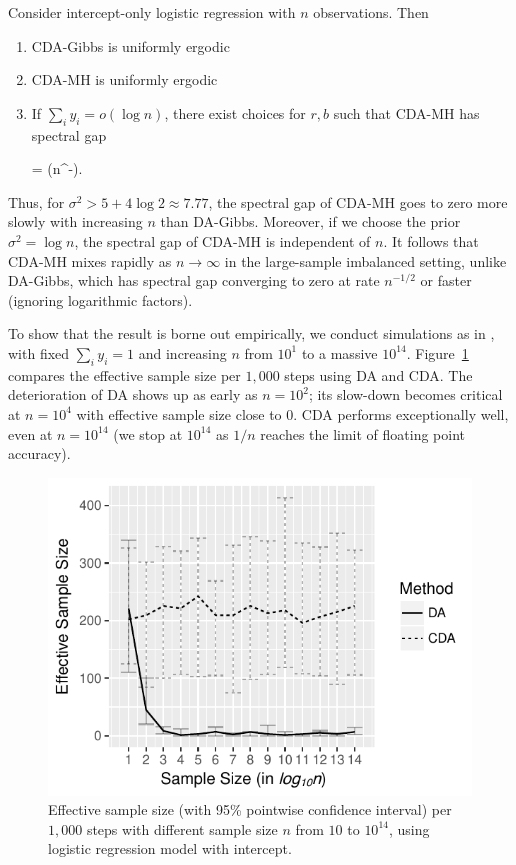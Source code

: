 \documentclass[twoside,11pt]{article}
\newcommand{\be}{\begin{equs}}
\newcommand{\ee}{\end{equs}}
\newcommand{\mc}[1]{\mathcal{#1}}
\newcommand{\bigO}{\mc O}
\newcommand{\1}{\mathbf 1}
\begin{document}
{\begin{theorem}
Consider intercept-only logistic regression with $n$ observations. Then
\begin{enumerate}
\item CDA-Gibbs is uniformly ergodic
\item CDA-MH is uniformly ergodic
\item If $\sum_i y_i = o(\log n)$, there exist choices for $r,b$ such that CDA-MH has spectral gap
\be
\kappa = \bigO(n^{-}).
\ee
\end{enumerate}
\end{theorem}
Thus, for $\sigma^2> 5+4 \log 2 \approx 7.77$, the spectral gap of CDA-MH goes to zero more slowly with increasing $n$ than DA-Gibbs. Moreover, if we choose the prior $\sigma^2 = \log n$, the spectral gap of CDA-MH is independent of $n$. It follows that CDA-MH mixes rapidly as $n \to \infty$ in the large-sample imbalanced setting, unlike DA-Gibbs, which has spectral gap converging to zero at rate $n^{-1/2}$ or faster (ignoring logarithmic factors).

To show that the result is borne out empirically, we conduct simulations as in \cite{johndrow2016inefficiency}, 
with fixed $\sum_i y_i=1$ and increasing $n$ from $10^1$ to a massive $10^{14}$.  
Figure~\ref{massive_n_sims} compares the effective sample size per $1,000$ steps using DA and CDA. The deterioration of DA shows up as early
as $n=10^2$; its slow-down becomes critical at $n=10^4$ with effective sample size close to $0$. CDA performs exceptionally well, even at $n=10^{14}$ (we stop at $10^{14}$ as $1/n$ reaches the limit of floating point accuracy).\begin{figure}[H]
  \centering
       \includegraphics[width=0.6\linewidth]{simMassiveN}
         {\caption{Effective sample size (with 95\% pointwise confidence interval) per $1,000$  steps  with different sample  size $n$ from $10$ to $10^{14}$, using logistic regression model with intercept.   \label{massive_n_sims}}}
\end{figure}


}
\end{document}
